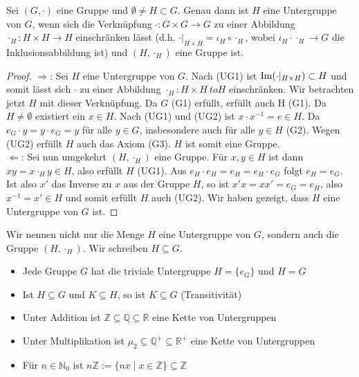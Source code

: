 \begin{proposition}
	Sei $(G,\cdot)$ eine Gruppe und $\emptyset \neq H \subset G$. Genau dann ist
	$H$ eine Untergruppe von $G$, wenn sich die Verknüpfung $\cdot: G \times G \to G$ zu einer
	Abbildung $\cdot_H: H \times H \to H$ einschränken lässt (d.h. $\cdot\vert_{H \times H}=
	\iota_H \circ \cdot_H$, wobei $\iota_H \cdot \cdot_H \to G$ die Inklusionsabbildung ist) und
	$(H,\cdot_H)$ eine Gruppe ist.
\end{proposition}
\begin{proof}
	$\Rightarrow$: Sei $H$ eine Untergruppe von $G$. Nach (UG1) ist $\operatorname{Im}(\cdot|_{H \times H}) \subset H$
	und somit lässt sich $\cdot$ zu einer Abbildung $\cdot_H: H \times H \ to H$ einschränken. Wir 
	betrachten jetzt $H$ mit dieser Verknüpfung. Da $G$ (G1) erfüllt, erfüllt auch H (G1). Da
	$H \neq \emptyset$ existiert ein $x \in H$. Nach (UG1) und (UG2) ist $x \cdot x^{-1}=e \in H$. Da 
	$e_G \cdot y=y \cdot e_G=y$ für alle $y \in G$, insbesondere auch für alle $y \in H$ (G2). Wegen
	(UG2) erfüllt $H$ auch das Axiom (G3). $H$ ist somit eine Gruppe. \\
	$\Leftarrow$: Sei nun umgekehrt $(H,\cdot_H)$ eine Gruppe. Für $x,y \in H$ ist dann $xy=x \cdot_H
	y \in H$, also erfüllt $H$ (UG1). Aus $e_H \cdot e_H=e_H=e_H \cdot e_G$ folgt $e_H=e_G$. Ist also
	$x'$ das Inverse zu $x$ aus der Gruppe $H$, so ist $x'x=xx'=e_G=e_H$, also $x^{-1}=x' \in H$ und
	somit erfüllt $H$ auch (UG2). Wir haben gezeigt, dass $H$ eine Untergruppe von $G$ ist.
\end{proof}

\begin{remark}
	Wir nennen nicht nur die Menge $H$ eine Untergruppe von $G$, sondern auch die Gruppe $(H,\cdot_H)$.
	Wir schreiben $H \subseteq G$.
\end{remark}

\begin{example}
	\begin{itemize}
		\item Jede Gruppe $G$ hat die triviale Untergruppe $H=\{e_G\}$ und $H=G$
		\item Ist $H \subseteq G$ und $K \subseteq H$, so ist $K \subseteq G$ (Transitivität)
		\item Unter Addition ist $\mathbb{Z} \subseteq \mathbb{Q} \subseteq \mathbb{R}$ eine Kette von Untergruppen
		\item Unter Multiplikation ist $\mu_2 \subseteq \mathbb{Q}^+ \subseteq \mathbb{R}^+$ eine Kette von 
		Untergruppen
		\item Für $n \in \mathbb{N}_0$ ist $n\mathbb{Z} := \{nx \mid x \in \mathbb{Z}\} \subseteq \mathbb{Z}$ 
	\end{itemize}
\end{example}

